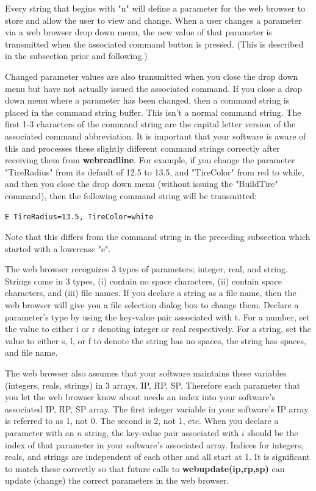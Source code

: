 Every string that begins with "n" will define a parameter for the web browser to store and allow the user to view and change.
When a user changes a parameter via a web browser drop down menu, the new value of that parameter is transmitted
when the associated command button is pressed. (This is described in the subsection prior and following.)

Changed parameter values are also transmitted when you close the drop down menu but have not actually issued the 
associated command. If you close a drop down menu where a parameter has been changed, then a command string
is placed in the command string buffer. This isn't a normal command string. The first 1-3 characters of the command string
are the capital letter version of the associated command abbreviation. It is important that your software is aware of this
and processes these slightly different command strings correctly after receiving them from \textbf{webreadline}. For
example, if you change the parameter "TireRadius" from its default of 12.5 to 13.5, and "TireColor" from red to while, and
then you close the drop down menu (without issuing the "BuildTire" command), then the following command string will be
transmitted:
\begin{verbatim}
E TireRadius=13.5, TireColor=white 
\end{verbatim}
Note that this differs from the command string in the preceding subsection which started with a lowercase "e".

The web browser recognizes 3 types of parameters; integer, real, and string. Strings come in 3 types,  (i) contain
no space characters, (ii) contain space characters, and (iii) file names. If you declare a string as a file name, then the web browser 
will give you a file selection dialog box to change them. Declare a parameter's type by using the key-value pair associated with
t. For a number, set the value to either i or r denoting integer or real respectively. For a string, set the value to either s, l, or f
to denote the string has no spaces, the string has spaces, and file name.  

The web browser also assumes that your software maintains these variables (integers, reals, strings) in 3 arrays, \f{IP}, \f{RP},
\f{SP}. Therefore each parameter that you let the web browser know about needs an index into your software's associated 
\f{IP}, \f{RP}, \f{SP} array. The first integer variable in your software's \f{IP} array is referred to as 1, not 0. The second is 2, not 1, etc. 
When you declare a parameter with an $n$ string, the key-value pair associated with $i$ should be the index of that
parameter in your software's associated array. Indices for integers, reals, and strings are independent
of each other and all start at 1. It is significant to match these correctly so that future calls to 
\textbf{webupdate(ip,rp,sp)} can update (change) the correct parameters in the web browser.

